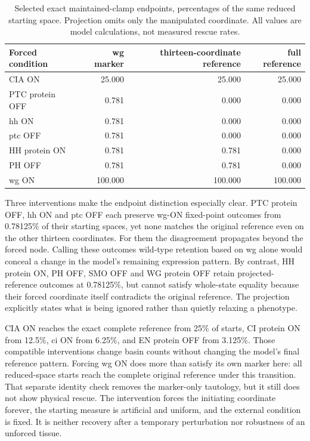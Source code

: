 \begin{table}[ht]\centering\small
\caption{Selected exact maintained-clamp endpoints, percentages of the same reduced starting space. Projection omits only the manipulated coordinate. All values are model calculations, not measured rescue rates.}
\begin{tabular}{lrrr}\toprule
Forced condition & wg marker & thirteen-coordinate reference & full reference\\\midrule
CIA ON & 25.000 & 25.000 & 25.000 \\
PTC protein OFF & 0.781 & 0.000 & 0.000 \\
hh ON & 0.781 & 0.000 & 0.000 \\
ptc OFF & 0.781 & 0.000 & 0.000 \\
HH protein ON & 0.781 & 0.781 & 0.000 \\
PH OFF & 0.781 & 0.781 & 0.000 \\
wg ON & 100.000 & 100.000 & 100.000 \\
\bottomrule\end{tabular}\end{table}

Three interventions make the endpoint distinction especially clear. PTC protein OFF, hh ON and ptc OFF each preserve wg-ON fixed-point outcomes from 0.78125\% of their starting spaces, yet none matches the original reference even on the other thirteen coordinates. For them the disagreement propagates beyond the forced node. Calling these outcomes wild-type retention based on wg alone would conceal a change in the model's remaining expression pattern. By contrast, HH protein ON, PH OFF, SMO OFF and WG protein OFF retain projected-reference outcomes at 0.78125\%, but cannot satisfy whole-state equality because their forced coordinate itself contradicts the original reference. The projection explicitly states what is being ignored rather than quietly relaxing a phenotype.

CIA ON reaches the exact complete reference from 25\% of starts, CI protein ON from 12.5\%, ci ON from 6.25\%, and EN protein OFF from 3.125\%. Those compatible interventions change basin counts without changing the model's final reference pattern. Forcing wg ON does more than satisfy its own marker here: all reduced-space starts reach the complete original reference under this transition. That separate identity check removes the marker-only tautology, but it still does not show physical rescue. The intervention forces the initiating coordinate forever, the starting measure is artificial and uniform, and the external condition is fixed. It is neither recovery after a temporary perturbation nor robustness of an unforced tissue.

